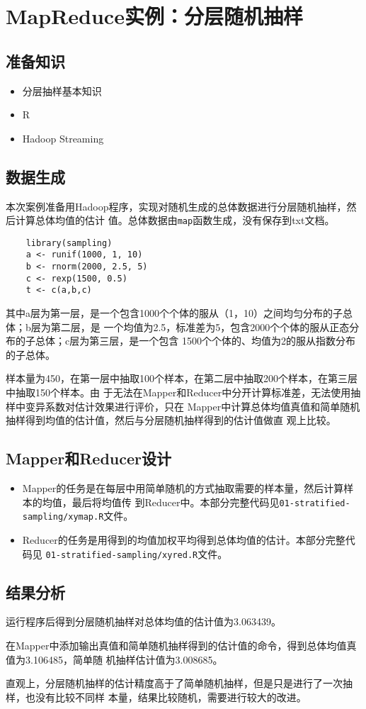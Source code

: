 \section{MapReduce实例：分层随机抽样}\label{ux5b9eux4f8bux5206ux6790ux5206ux5c42ux968fux673aux62bdux6837}

\subsection{准备知识}\label{ux51c6ux5907ux77e5ux8bc6}

\begin{itemize}
\itemsep1pt\parskip0pt
\item
  分层抽样基本知识
\item
  R
\item
  Hadoop Streaming
\end{itemize}

\subsection{数据生成}\label{ux6570ux636eux751fux6210}

本次案例准备用Hadoop程序，实现对随机生成的总体数据进行分层随机抽样，然后计算总体均值的估计
值。总体数据由\lstinline|map|函数生成，没有保存到txt文档。

\begin{lstlisting}
	library(sampling)
	a <- runif(1000, 1, 10)
	b <- rnorm(2000, 2.5, 5)
	c <- rexp(1500, 0.5)
	t <- c(a,b,c)
\end{lstlisting}

其中a层为第一层，是一个包含1000个个体的服从（1，10）之间均匀分布的子总体；b层为第二层，是
一个均值为2.5，标准差为5，包含2000个个体的服从正态分布的子总体；c层为第三层，是一个包含
1500个个体的、均值为2的服从指数分布的子总体。

样本量为450，在第一层中抽取100个样本，在第二层中抽取200个样本，在第三层中抽取150个样本。由
于无法在Mapper和Reducer中分开计算标准差，无法使用抽样中变异系数对估计效果进行评价，只在
Mapper中计算总体均值真值和简单随机抽样得到均值的估计值，然后与分层随机抽样得到的估计值做直
观上比较。

\subsection{Mapper和Reducer设计}\label{mapperux548creducerux8bbeux8ba1}

\begin{itemize}
\item
  Mapper的任务是在每层中用简单随机的方式抽取需要的样本量，然后计算样本的均值，最后将均值传
  到Reducer中。本部分完整代码见\lstinline!01-stratified-sampling/xymap.R!文件。
\item
  Reducer的任务是用得到的均值加权平均得到总体均值的估计。本部分完整代码见
  \lstinline!01-stratified-sampling/xyred.R!文件。
\end{itemize}

\subsection{结果分析}\label{ux7ed3ux679c}

运行程序后得到分层随机抽样对总体均值的估计值为3.063439。

在Mapper中添加输出真值和简单随机抽样得到的估计值的命令，得到总体均值真值为3.106485，简单随
机抽样估计值为3.008685。

直观上，分层随机抽样的估计精度高于了简单随机抽样，但是只是进行了一次抽样，也没有比较不同样
本量，结果比较随机，需要进行较大的改进。
